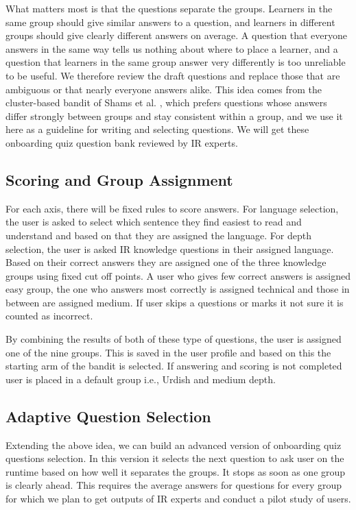 \documentclass{FastFyp}
\begin{document}
What matters most is that the questions separate the groups. Learners in the same group should give similar answers to a question, and learners in different groups should give clearly different answers on average. A question that everyone answers in the same way tells us nothing about where to place a learner, and a question that learners in the same group answer very differently is too unreliable to be useful. We therefore review the draft questions and replace those that are ambiguous or that nearly everyone answers alike. This idea comes from the cluster-based bandit of Shams et al. \cite{shams2021cluster}, which prefers questions whose answers differ strongly between groups and stay consistent within a group, and we use it here as a guideline for writing and selecting questions. We will get these onboarding quiz question bank reviewed by IR experts.

\subsection{Scoring and Group Assignment}
For each axis, there will be fixed rules to score answers. For language selection, the user is asked to select which sentence they find easiest to read and understand and based on that they are assigned the language. For depth selection, the user is asked IR knowledge questions in their assigned language. Based on their correct answers they are assigned one of the three knowledge groups using fixed cut off points. A user who gives few correct answers is assigned easy group, the one who answers most correctly is assigned technical and those in between are assigned medium. If user skips a questions or marks it not sure it is counted as incorrect.

By combining the results of both of these type of questions, the user is assigned one of the nine groups. This is saved in the user profile and based on this the starting arm of the bandit is selected. If answering and scoring is not completed user is placed in a default group i.e., Urdish and medium depth.

\subsection{Adaptive Question Selection}
Extending the above idea, we can build an advanced version of onboarding quiz questions selection. In this version it selects the next question to ask user on the runtime based on how well it separates the groups. It stops as soon as one group is clearly ahead. This requires the average answers for questions for every group for which we plan to get outputs of IR experts and conduct a pilot study of users.
\end{document}
